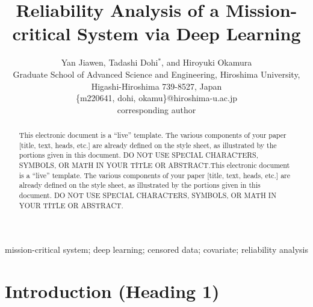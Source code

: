 \documentclass[conference]{IEEEconf}
\begin{document}
\title{\textbf{\Large Reliability Analysis of a Mission-critical System via Deep Learning}}

\author{Yan Jiawen, Tadashi Dohi$^{*}$, and Hiroyuki Okamura\\
	\normalsize Graduate School of Advanced Science and Engineering, Hiroshima University, Higashi-Hiroshima 739-8527, Japan\\
	\normalsize \{m220641, dohi, okamu\}@hiroshima-u.ac.jp\\
	\normalsize *corresponding author
}


\maketitle
\begin{abstract}

This electronic document is a “live” template. The various components of your paper [title, text, heads, etc.] are already defined on the style sheet, as illustrated by the portions given in this document. DO NOT USE SPECIAL CHARACTERS, SYMBOLS, OR MATH IN YOUR TITLE OR ABSTRACT.This electronic document is a “live” template. The various components of your paper [title, text, heads, etc.] are already defined on the style sheet, as illustrated by the portions given in this document. DO NOT USE SPECIAL CHARACTERS, SYMBOLS, OR MATH IN YOUR TITLE OR ABSTRACT.
\end{abstract}

\IEEEoverridecommandlockouts
\vspace{1.5ex}
\begin{keywords}
mission-critical system; deep learning; censored data; covariate; reliability analysis
\end{keywords}

%
\IEEEpeerreviewmaketitle


\section{Introduction (Heading 1)} 
\end{document}
